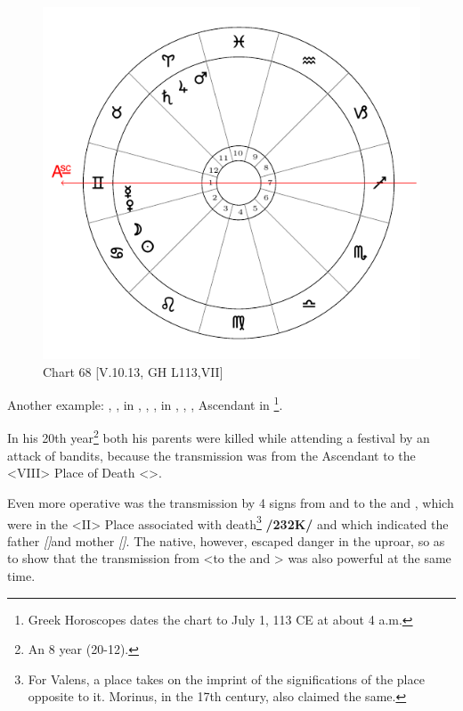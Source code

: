 \begin{figure}
\centering
\includegraphics[width=.68\textwidth]{charts/5_10_13}
\caption{Chart 68 [V.10.13, GH L113,VII]}
\label{fig:chart68}
\end{figure}

\newpage
\noindent Another example: \Sun, \Moon, in \Cancer, \Saturn, \Jupiter, \Mars\xspace in \Aries, \Venus, \Mercury, Ascendant in \Gemini\footnote{{Greek Horoscopes} dates the chart to July 1, 113 CE at about 4 a.m.}. 

In his 20th year\footnote{An 8 year (20-12).} both his parents were killed while attending a festival by an attack of bandits, because the transmission was from the Ascendant to the <VIII> Place of Death <\Capricorn>. 

Even more operative was the transmission by 4 signs from \Saturn\xspace and \Mars\xspace to the \Sun\xspace and \Moon, which were in the
<II> Place associated with death\footnote{For Valens, a place takes on the imprint of the significations of the place opposite to it. Morinus, in the 17th century, also claimed the same.} \textbf{/232K/} and which indicated the father \textsl{[\Sun]}and mother \textsl{[\Moon]}. The native, however, escaped danger in the uproar, so as to show that the transmission from \Jupiter\xspace <to the \Sun\xspace and \Moon> was also powerful at the same time.
\newpage